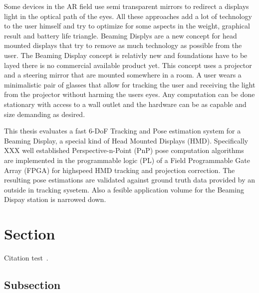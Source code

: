 Some devices in the AR field use semi transparent mirrors to redirect a displays light in the optical path of the eyes.
All these approaches add a lot of technology to the user himself and try to optimize for some aspects in the weight, graphical result and battery life triangle.
Beaming Displys are a new concept for head mounted displays that try to remove as much technology as possible from the user.
The Beaming Display concept is relativly new and foundations have to be layed there is no commercial available product yet.
This concept uses a projector and a steering mirror that are mounted somewhere in a room.
A user wears a minimalistic pair of glasses that allow for tracking the user and receiving the light from the projector without harming the users eyes.
Any computation can be done stationary with access to a wall outlet and the hardware can be as capable and size demanding as desired.



This thesis evaluates a fast 6-DoF Tracking and Pose estimation system for a Beaming Display, a special kind of Head Mounted Displays (HMD).
Specifically XXX well established Perspective-n-Point (PnP) pose computation algorithms are implemented in the programmable logic (PL) of a Field Programmable Gate Array (FPGA) for highspeed HMD tracking and projection correction.
The resulting pose estimations are validated against ground truth data provided by an outside in tracking sysetem.
Also a fesible application volume for the Beaming Dispay station is narrowed down.

\section{Section}
Citation test~\parencite{latex}.

\subsection{Subsection}


